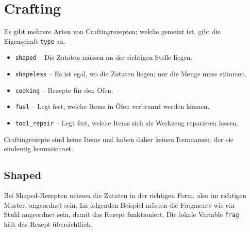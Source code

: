 \section{Crafting}\label{crafting}

Es gibt mehrere Arten von Craftingrezepten; welche gemeint ist, gibt die
Eigenschaft \texttt{type} an.

\begin{itemize}
\tightlist
\item
  \texttt{shaped} -- Die Zutaten müssen an der richtigen Stelle liegen.
\item
  \texttt{shapeless} -- Es ist egal, wo die Zutaten liegen; nur die
  Menge muss stimmen.
\item
  \texttt{cooking} -- Rezepte für den Ofen.
\item
  \texttt{fuel} -- Legt fest, welche Items in Öfen verbrannt werden
  können.
\item
  \texttt{tool\_\allowbreak{}repair} -- Legt fest, welche Items sich als
  Werkzeug reparieren lassen.
\end{itemize}

Craftingrezepte sind keine Items und haben daher keinen Itemnamen, der
sie eindeutig kennzeichnet.

\subsection{Shaped}\label{shaped}

Bei Shaped-Rezepten müssen die Zutaten in der richtigen Form, also im
richtigen Muster, angeordnet sein. Im folgenden Beispiel müssen die
Fragmente wie ein Stuhl angeordnet sein, damit das Rezept funktioniert.
Die lokale Variable \texttt{frag} hält das Rezept übersichtlich.

\begin{Shaded}
\begin{Highlighting}[]
  \OperatorTok{=} 

\OperatorTok{(\{}
     \OperatorTok{=} \OperatorTok{,}
     \OperatorTok{=} \OperatorTok{,}
     \OperatorTok{=} \OperatorTok{\{}
        \OperatorTok{\{} \OperatorTok{,} \OperatorTok{,}    \OperatorTok{\},}
        \OperatorTok{\{} \OperatorTok{,} \OperatorTok{,}  \OperatorTok{\},}
        \OperatorTok{\{} \OperatorTok{,} \OperatorTok{,}  \OperatorTok{\},}
    \OperatorTok{\},}
\OperatorTok{\})}
\end{Highlighting}
\end{Shaded}

